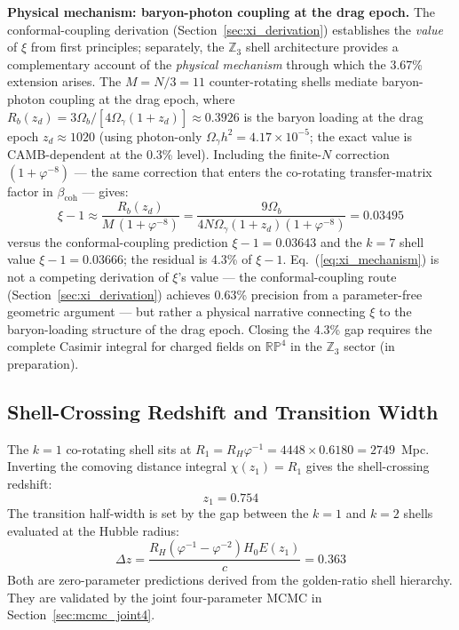 \documentclass[12pt,a4paper]{article}
\begin{document}
\textbf{Physical mechanism: baryon-photon coupling at the drag epoch.}
The conformal-coupling derivation (Section~\ref{sec:xi_derivation}) establishes
the \emph{value} of $\xi$ from first principles; separately, the $\mathbb{Z}_3$
shell architecture provides a complementary account of the \emph{physical mechanism}
through which the 3.67\% extension arises. The $M = N/3 = 11$ counter-rotating
shells mediate baryon-photon coupling at the drag epoch, where
$R_b(z_d) = 3\Omega_b / [4\Omega_\gamma(1+z_d)] \approx 0.3926$
is the baryon loading at the drag epoch $z_d \approx 1020$ (using photon-only
$\Omega_\gamma h^2 = 4.17 \times 10^{-5}$; the exact value is CAMB-dependent
at the 0.3\% level). Including the
finite-$N$ correction $(1+\varphi^{-8})$ --- the same correction that enters
the co-rotating transfer-matrix factor in $\beta_\mathrm{coh}$ --- gives:
\begin{equation}
  \xi - 1 \approx \frac{R_b(z_d)}{M\,(1+\varphi^{-8})}
  = \frac{9\Omega_b}{4 N \Omega_\gamma(1+z_d)(1+\varphi^{-8})}
  = 0.03495
  \label{eq:xi_mechanism}
\end{equation}
versus the conformal-coupling prediction $\xi - 1 = 0.03643$ and the $k=7$ shell
value $\xi - 1 = 0.03666$; the residual is 4.3\% of $\xi-1$.
Eq.~(\ref{eq:xi_mechanism}) is not a competing derivation of $\xi$'s value ---
the conformal-coupling route (Section~\ref{sec:xi_derivation}) achieves 0.63\%
precision from a parameter-free geometric argument --- but rather a physical
narrative connecting $\xi$ to the baryon-loading structure of the drag epoch.
Closing the 4.3\% gap requires the complete Casimir integral for charged fields
on $\mathbb{RP}^4$ in the $\mathbb{Z}_3$ sector (in preparation).

\subsection{Shell-Crossing Redshift and Transition Width}
\label{sec:shellcross_pred}

The $k=1$ co-rotating shell sits at $R_1 = R_H\varphi^{-1} = 4448 \times 0.6180 = 2749$~Mpc.
Inverting the comoving distance integral $\chi(z_1) = R_1$ gives the
shell-crossing redshift:
\begin{equation}
  z_1 = 0.754
\end{equation}
The transition half-width is set by the gap between the $k=1$ and $k=2$ shells
evaluated at the Hubble radius:
\begin{equation}
  \Delta z = \frac{R_H(\varphi^{-1}-\varphi^{-2})H_0 E(z_1)}{c} = 0.363
\end{equation}
Both are zero-parameter predictions derived from the golden-ratio shell hierarchy.
They are validated by the joint four-parameter MCMC in Section~\ref{sec:mcmc_joint4}.
\end{document}
